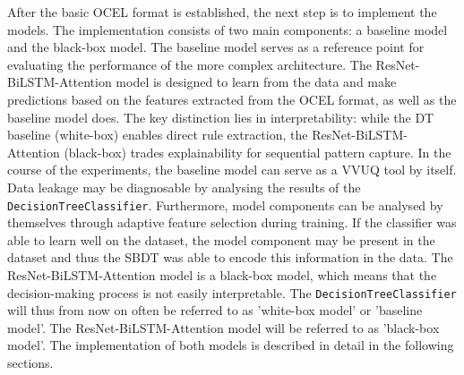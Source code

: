 After the basic OCEL format is established, the next step is to implement the models. The implementation consists of two main components: a baseline model and the black-box model. The baseline model serves as a reference point for evaluating the performance of the more complex architecture. The ResNet-BiLSTM-Attention model is designed to learn from the data and make predictions based on the features extracted from the OCEL format, as well as the baseline model does. The key distinction lies in interpretability: while the DT baseline (white-box) enables direct rule extraction, the ResNet-BiLSTM-Attention (black-box) trades explainability for sequential pattern capture. In the course of the experiments, the baseline model can serve as a VVUQ tool by itself. Data leakage may be diagnosable by analysing the results of the \texttt{DecisionTreeClassifier}. Furthermore, model components can be analysed by themselves through adaptive feature selection during training. If the classifier was able to learn well on the dataset, the model component may be present in the dataset and thus the SBDT was able to encode this information in the data. The ResNet-BiLSTM-Attention model is a black-box model, which means that the decision-making process is not easily interpretable. The \texttt{DecisionTreeClassifier} will thus from now on often be referred to as 'white-box model' or 'baseline model'. The ResNet-BiLSTM-Attention model will be referred to as 'black-box model'. The implementation of both models is described in detail in the following sections.

